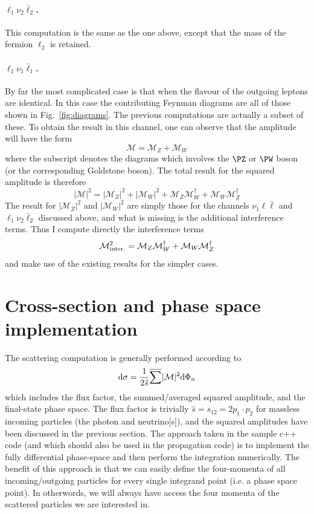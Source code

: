 \documentclass[a4paper,11pt]{article}
\def \beq{\begin{equation}}
\def \eeq{\end{equation}}
\begin{document}
\paragraph{$\ell_1 \nu_2 \bar\ell_2$.}
This computation is the same as the one above, except that the mass of the fermion $\ell_2$ is retained.

\paragraph{$\ell_1 \nu_1 \bar\ell_1$.}
By far the most complicated case is that when the flavour of the outgoing leptons are identical.
%
In this case the contributing Feynman diagrams are all of those shown in Fig.~\ref{fig:diagrams}.
%
The previous computations are actually a subset of these. To obtain the result in this channel, one can observe that the amplitude will have the form
%
\beq
\mathcal{M} = \mathcal{M}_Z + \mathcal{M}_W
\eeq
%
where the subscript denotes the diagrams which involves the $\PZ$ or $\PW$ boson (or the corresponding Goldstone boson). The total result for the squared amplitude is therefore
%
\beq
|\mathcal{M}|^2 = |\mathcal{M}_Z|^2 + |\mathcal{M}_W|^2 +\mathcal{M}_Z \mathcal{M}_W^{\dagger} + \mathcal{M}_W \mathcal{M}_Z^{\dagger}
\eeq
%
The result for $|\mathcal{M}_Z|^2$ and $|\mathcal{M}_W|^2$ are simply those for the channels $\nu_1 \ell \bar \ell$ and $\ell_1 \nu_2 \bar \ell_2$ discussed above, and what is missing is the additional interference terms.
%
Thus I compute directly the interference terms 
%
\beq
\mathcal{M}^2_{\rm inter.} = \mathcal{M}_Z \mathcal{M}_W^{\dagger} + \mathcal{M}_W \mathcal{M}_Z^{\dagger}
\eeq
and make use of the existing results for the simpler cases.


\section{Cross-section and phase space implementation}
The scattering computation is generally performed according to
%
\beq
{\rm d} \sigma = \frac{1}{2 \hat{s}} \overline{\sum} |\mathcal{M}|^2 {\rm d}\Phi_n
\eeq
%
which includes the flux factor, the summed/averaged squared amplitude, and the final-state phase space. 
%
The flux factor is trivially $\hat{s} = s_{12} = 2 p_1 \cdot p_2$ for massless incoming particles (the photon and neutrino[s]), and the squared amplitudes have been discussed in the previous section.
%
The approach taken in the sample c++ code (and which should also be used in the propagation code) is to implement the fully differential phase-space and then perform the integration numerically. The benefit of this approach is that we can easily define the four-momenta of all incoming/outgoing particles for every single integrand point (i.e. a phase space point). In otherwords, we will always have access the four momenta of the scattered particles we are interested in.
\end{document}
